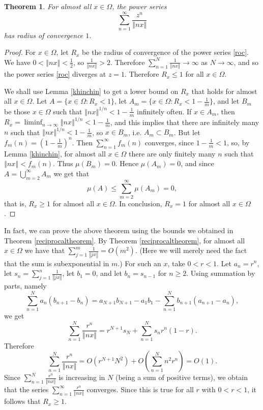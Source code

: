 \documentclass{article}
\newcommand{\norm}[1]{\left\Vert #1 \right\Vert}
\newtheorem{theorem}{Theorem}
\begin{document}
\begin{theorem}
For almost all $x \in \Omega$, the power series 
\begin{equation}
\sum_{n=1}^\infty \frac{z^n}{\norm{nx}}
\label{roc}
\end{equation}
has radius of convergence $1$.
\label{roclemma}
\end{theorem}
\begin{proof}
For $x \in \Omega$, let $R_x$ be the radius of convergence of the power series \eqref{roc}.
We have $0 < \norm{nx} < \frac{1}{2}$, so $\frac{1}{\norm{nx}} > 2$. Therefore $\sum_{n=1}^N \frac{1}{\norm{nx}} \to \infty$ as $N \to \infty$, and so
the power series \eqref{roc} diverges at $z=1$. Therefore $R_x \leq 1$ for all $x \in \Omega$.

We shall use Lemma \ref{khinchin} to get a lower bound on $R_x$ that holds for almost all $x \in \Omega$.
Let $A=\{x \in \Omega: R_x<1\}$,
let $A_m=\{x \in \Omega:R_x<1-\frac{1}{m}\}$, and let
$B_m$ be those $x \in \Omega$ such that $\norm{nx}^{1/n}<1-\frac{1}{m}$ infinitely often.
If $x \in A_m$, then $R_x=\liminf_{n \to \infty} \norm{nx}^{1/n}<1-\frac{1}{m}$, and this implies that there are infinitely many $n$ such that
$\norm{nx}^{1/n}<1-\frac{1}{m}$, so $x \in B_m$, i.e. 
$A_m \subset B_m$.
But let $f_m(n)=\left(1-\frac{1}{m}\right)^n$. Then $\sum_{n=1}^\infty f_m(n)$ converges, since $1-\frac{1}{m}<1$, so, by Lemma \ref{khinchin}, for almost all $x \in \Omega$ there are only
finitely many $n$ such that $\norm{nx} < f_m(n)$. Thus $\mu(B_m)=0$. Hence $\mu(A_m)=0$, and since $A=\bigcup_{m=2}^\infty A_m$ we
get that
\[
\mu(A) \leq \sum_{m=2}^\infty \mu(A_m)=0,
\]
that is, $R_x \geq 1$ for almost all $x \in \Omega$. In conclusion, $R_x=1$ for almost all $x \in \Omega$.
\end{proof}

In fact, we can prove the above theorem using the bounds we obtained in Theorem \ref{reciprocaltheorem}.
By Theorem \ref{reciprocaltheorem}, for almost all $x \in \Omega$ we have that $\sum_{j=1}^m \frac{1}{\norm{j x}}=O(m^2)$. (Here we will merely need the fact that the sum is 
subexponential in $m$.) For such an $x$, take $0<r<1$.
Let $a_n=r^n$, let $s_n=\sum_{j=1}^n \frac{1}{\norm{j x}}$, let $b_1=0$, and let $b_n=s_{n-1}$ for $n  \geq 2$. Using summation by parts,
namely
\[
\sum_{n=1}^N a_n(b_{n+1}-b_n)=a_{N+1}b_{N+1}-a_1 b_1 - \sum_{n=1}^N b_{n+1}(a_{n+1}-a_n),
\]
we get
\[
\sum_{n=1}^N \frac{r^n}{\norm{nx}} = r^{N+1} s_N + \sum_{n=1}^N s_n  r^n (1-r).
\]
Therefore
\[
\sum_{n=1}^N \frac{r^n}{\norm{nx}}  = O\left(r^{N+1} N^2\right) + O\left( \sum_{n=1}^N n^2 r^n \right)=O(1).
\]
Since $\sum_{n=1}^N \frac{r^n}{\norm{nx}}$ is increasing in $N$ (being a sum of positive terms), we obtain that the series
$\sum_{n=1}^\infty \frac{r^n}{\norm{nx}}$ converges. Since this is true for all $r$ with $0<r<1$, it follows that $R_x \geq 1$.
\end{document}

